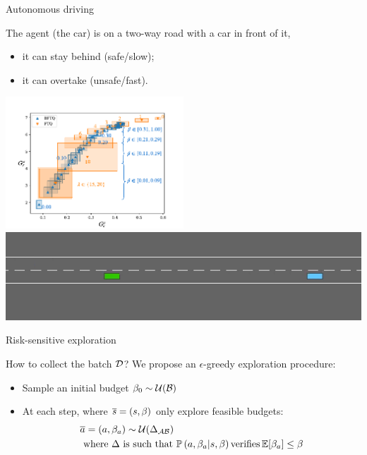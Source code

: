 \documentclass[slideopt,A4,showboxes,svgnames]{beamer}
\begin{document}
\begin{frame}{Autonomous driving}

The agent (the car) is on a two-way road with a car in front of it,
\begin{itemize}
	\item it can {\green stay behind} {\green (safe/slow)};
	\item it can {\red overtake} {\red (unsafe/fast)}.
	\end{itemize}

\begin{center}
\includegraphics[trim={0 0cm 0 0.8cm}, clip, width=0.5\textwidth]{../../source/img/highway.pdf}\\
\href{https://budgeted-rl.github.io/\#driving-styles}{\includegraphics[width=0.5\linewidth]{img/highway_env}}
\end{center}
\end{frame}

\begin{frame}{Risk-sensitive exploration}
\begin{alertblock}{How to collect the batch $\mathcal{D}$?}
We propose an $\epsilon$-greedy exploration procedure:
\pause
\begin{itemize}[<+->]
	\item Sample an initial budget $\beta_0\sim\mathcal{U}(\mathcal{B})$
	\item At each step, where $\overline{s}=(s,\beta)$ only explore feasible budgets:
	\begin{align*}
	&\overline{a} = (a, \beta_a)\sim\mathcal{U}(\Delta_{\mathcal{A}\mathcal{B}})\\
	&\text{ where }  \Delta \text{ is such that }\mathbb{P}\left(a, \beta_a|s, \beta\right) \text{verifies} \operatorname*{\mathbb{E}}[\beta_a]\leq\beta
	\end{align*}
\end{itemize}
\end{alertblock}
\end{frame}
\end{document}
